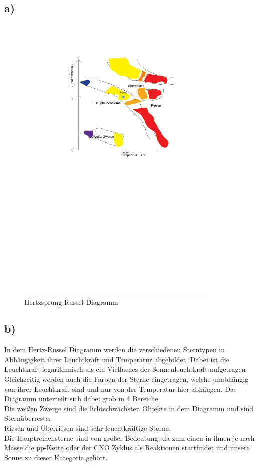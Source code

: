 \subsection{a)}

\begin{figure}[H]
    \centering
    \caption{Hertzsprung-Russel Diagramm}
    \includegraphics[width=0.9\textwidth]{images/hertz_russel.pdf}
\end{figure}

\subsection{b)}
In dem Hertz-Russel Diagramm werden die verschiedenen Sterntypen
in Abhängigkeit ihrer Leuchtkraft und Temperatur abgebildet.
Dabei ist die Leuchtkraft logarithmisch als ein Vielfaches der
Sonnenleuchtkraft aufgetragen
Gleichzeitig werden auch die Farben der Sterne eingetragen, welche unabhängig
von ihrer Leuchtkraft sind und nur von der Temperatur hier abhängen.
Das Diagramm unterteilt sich dabei grob in 4 Bereiche.\\
Die weißen Zwerge sind die lichtschwächsten Objekte in dem Diagramm und sind Sternüberreste.\\
Riesen und Überriesen sind sehr leuchtkräftige Sterne.\\
Die Hauptreihensterne sind von großer Bedeutung, da zum einen in ihnen je nach Masse 
die pp-Kette oder der CNO Zyklus als Reaktionen stattfindet und unsere Sonne zu dieser Kategorie gehört.


